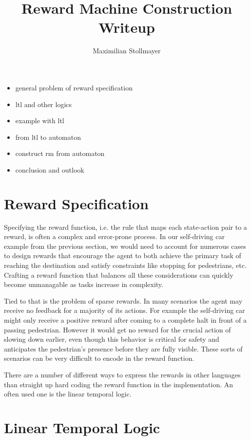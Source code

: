 \documentclass[12pt, a4paper]{article}
\title{Reward Machine Construction Writeup}
\author{Maximilian Stollmayer}
\date{}
\theoremstyle{plain}
\begin{document}
\maketitle

\begin{itemize}
	\item general problem of reward specification
	\item ltl and other logics
	\item example with ltl
	\item from ltl to automaton
	\item construct rm from automaton
	\item conclusion and outlook
\end{itemize}

\section*{Reward Specification}

Specifying the reward function, i.e. the rule that maps each state-action pair to a reward, is often a complex and error-prone process. In our self-driving car example from the previous section, we would need to account for numerous cases to design rewards that encourage the agent to both achieve the primary task of reaching the destination and satisfy constraints like stopping for pedestrians, etc. Crafting a reward function that balances all these considerations can quickly become unmanagable as tasks increase in complexity.

Tied to that is the problem of sparse rewards. In many scenarios the agent may receive no feedback for a majority of its actions. For example the self-driving car might only receive a positive reward after coming to a complete halt in front of a passing pedestrian. However it would get no reward for the crucial action of slowing down earlier, even though this behavior is critical for safety and anticipates the pedestrian's presence before they are fully visible. These sorts of scenarios can be very difficult to encode in the reward function.

There are a number of different ways to express the rewards in other languages than straight up hard coding the reward function in the implementation. An often used one is the linear temporal logic.

\section*{Linear Temporal Logic}
\end{document}

